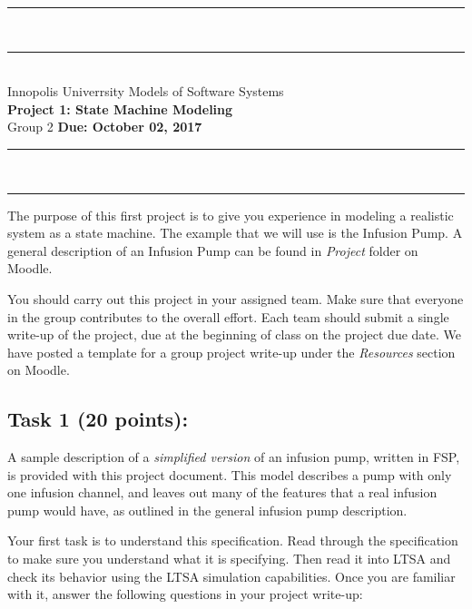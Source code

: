 \documentclass{article}
\newcommand{\head}{\subsection*}
\begin{document}
\begin{center}
\rule{\textwidth}{1.5pt} \\ \rule[10pt]{\textwidth}{1pt}\\
Innopolis Univerrsity \hfill Models of Software Systems\\[3ex]
{\Large\bf Project 1: State Machine Modeling}\\[3ex]
Group 2 \hfill {\bf Due: October 02, 2017} \rule{\textwidth}{1pt}
\\\rule[9.5pt]{\textwidth}{1.5pt}
\end{center}

The purpose of this first project is to give you experience in
modeling a realistic system as a state machine. The example that we
will use is the Infusion Pump. A general description of an Infusion
Pump can be found in \textit{Project} folder on Moodle. 

\bigskip You should carry out this project in your assigned team. Make sure that
everyone in the group contributes to the overall effort. Each team should submit a
single write-up of the project, due at the beginning of class on the project due
date. We have posted a template for a group project write-up under the
\textit{Resources} section on Moodle.

\head{Task 1 (20 points):}

A sample description of a \emph{simplified version} of an infusion
pump, written in FSP, is provided with this project document. This
model describes a pump with only one infusion channel, and leaves
out many of the features that a real infusion pump would have, as
outlined in the general infusion pump description.

\bigskip Your first task is to understand this specification. Read
through the specification to make sure you understand what it is
specifying. Then read it into LTSA and check its behavior using the
LTSA simulation capabilities. Once you are familiar with it, answer
the following questions in your project write-up:
\end{document}
